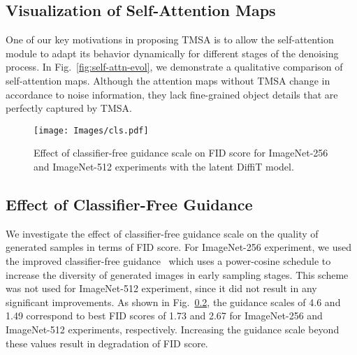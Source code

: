 \subsection{Visualization of Self-Attention Maps}
\label{sec:abl-temporal-attn}
One of our key motivations in proposing TMSA is to allow the self-attention module to adapt its behavior dynamically for different stages of the denoising process. In Fig.~\ref{fig:self-attn-evol}, we demonstrate a qualitative comparison of self-attention maps. Although the attention maps without TMSA change in accordance to noise information, they lack fine-grained object details that are perfectly captured by TMSA.











\begin{figure}\centering
\texttt{[image: Images/cls.pdf]}
\caption{Effect of classifier-free guidance scale on FID score for ImageNet-256 and ImageNet-512 experiments with the latent DiffiT model.}\vspace{-4mm}
\label{fig:self-class-guide}
\end{figure}

\subsection{Effect of Classifier-Free Guidance}
\label{sec:abl-class-guidance}
We investigate the effect of classifier-free guidance scale on the quality of generated samples in terms of FID score. For ImageNet-256 experiment, we used the improved classifier-free guidance~\cite{gao2023masked} which uses a power-cosine schedule to increase the diversity of generated images in early sampling stages. This scheme was not used for ImageNet-512 experiment, since it did not result in any significant improvements. As shown in Fig.~\ref{sec:abl-class-guidance}, the guidance scales of 4.6 and 1.49 correspond to best FID scores of 1.73 and 2.67 for ImageNet-256 and ImageNet-512 experiments, respectively. Increasing the guidance scale beyond these values result in degradation of FID score. 
